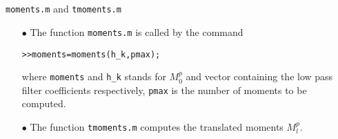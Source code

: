\documentclass[acmtoms]{acmtrans2m}
\begin{document}
\section{} \verb#moments.m# and \verb#tmoments.m# 
\begin{itemize}
\item[$\bullet$] The function \verb#moments.m# is called by the command
\begin{alltt} 
>>moments = moments (h_k, pmax);
\end{alltt}
where \verb#moments# and \verb#h_k# stands for $M_0^p$ and vector containing the low pass filter
coefficients respectively, \verb#pmax# is the number of moments to be
computed.  
\item[$\bullet$] The function \verb#tmoments.m# computes the translated moments $M_l^p$.
\end{itemize}
\end{document}
